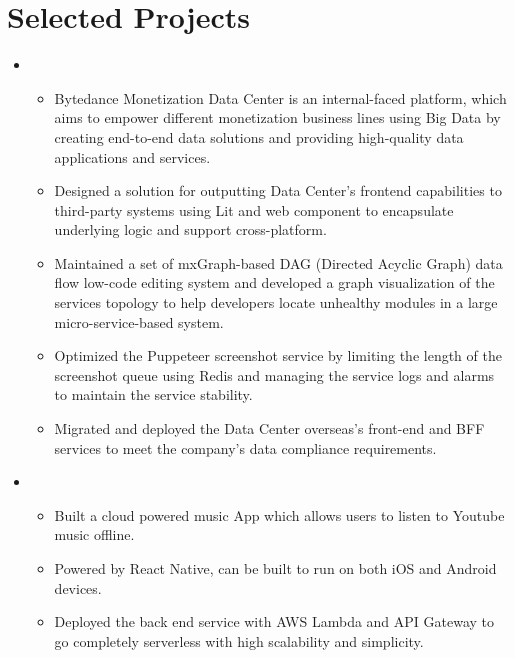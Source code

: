 \documentclass[11pt,a4paper,sans]{moderncv}        %
\begin{document}
\section{Selected Projects}
\vspace{2pt}
\begin{itemize}

\item{

  \begin{itemize}
    \item{Bytedance Monetization Data Center is an internal-faced platform, which aims to
      empower different monetization business lines using Big Data by creating end-to-end
      data solutions and providing high-quality data applications and services.
    }
    \vspace{2pt}
    \item{Designed a solution for outputting Data Center's frontend capabilities to third-party
      systems using Lit and web component to encapsulate underlying logic and support
      cross-platform.}
    \vspace{2pt}
    \item{Maintained a set of mxGraph-based DAG (Directed Acyclic Graph) data flow
    low-code editing system and developed a graph visualization of the services
    topology to help developers locate unhealthy modules in a large micro-service-based system.}
    \vspace{2pt}
    \item{Optimized the Puppeteer screenshot service by limiting the length of the screenshot queue using Redis and managing the service logs and alarms to maintain the service stability. }
    \vspace{2pt}
    \item{Migrated and deployed the Data Center overseas's front-end and BFF services to meet the company's data compliance requirements.}
  \end{itemize}
}

\vspace{0.75em}

\item{

  \begin{itemize}
  \item{Built a cloud powered music App which allows users to listen to Youtube music offline.}
  \vspace{2pt}
  \item{Powered by React Native, can be built to run on both iOS and Android devices.}
  \vspace{2pt}
  \item{Deployed the back end service with AWS Lambda and API Gateway to go completely serverless with high scalability and simplicity.}
  \end{itemize}
}

\end{itemize}
\end{document}
